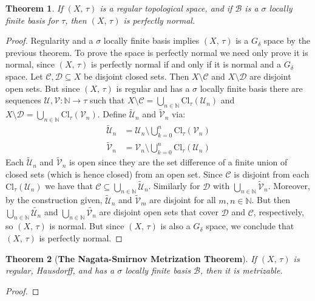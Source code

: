 \documentclass{article}
\theoremstyle{plain}
\newtheorem{theorem}{Theorem}[section]
\theoremstyle{normal}
\begin{document}
        \begin{theorem}
            If $(X,\,\tau)$ is a regular topological space, and if
            $\mathcal{B}$ is a $\sigma$ locally finite basis for $\tau$,
            then $(X,\,\tau)$ is perfectly normal.
        \end{theorem}
        \begin{proof}
            Regularity and a $\sigma$ locally finite basis implies $(X,\,\tau)$
            is a $G_{\delta}$ space by the previous theorem. To prove the space
            is perfectly normal we need only prove it is normal, since
            $(X,\,\tau)$ is perfectly normal if and only if it is normal and a
            $G_{\delta}$ space. Let $\mathcal{C},\mathcal{D}\subseteq{X}$ be
            disjoint closed sets. Then $X\setminus\mathcal{C}$ and
            $X\setminus\mathcal{D}$ are disjoint open sets. But since
            $(X,\,\tau)$ is regular and has a $\sigma$ locally finite basis
            there are sequences
            $\mathcal{U},\mathcal{V}:\mathbb{N}\rightarrow\tau$ such that
            $X\setminus\mathcal{C}=\bigcup_{n\in\mathbb{N}}\textrm{Cl}_{\tau}(\mathcal{U}_{n})$
            and
            $X\setminus\mathcal{D}=\bigcup_{n\in\mathbb{N}}\textrm{Cl}_{\tau}(\mathcal{V}_{n})$.
            Define $\tilde{\mathcal{U}}_{n}$ and
            $\tilde{\mathcal{V}}_{n}$ via:
            \begin{align}
                \tilde{\mathcal{U}}_{n}
                &=\mathcal{U}_{n}\setminus\bigcup_{k=0}^{n}
                    \textrm{Cl}_{\tau}(\mathcal{V}_{n})\\
                \tilde{\mathcal{V}}_{n}
                &=\mathcal{V}_{n}\setminus\bigcup_{k=0}^{n}
                    \textrm{Cl}_{\tau}(\mathcal{U}_{n})
            \end{align}
            Each $\tilde{\mathcal{U}}_{n}$ and $\tilde{\mathcal{V}}_{n}$ is
            open since they are the set difference of a finite union of closed
            sets (which is hence closed) from an open set. Since
            $\mathcal{C}$ is disjoint from each
            $\textrm{Cl}_{\tau}(\mathcal{U}_{n})$ we have that
            $\mathcal{C}\subseteq\bigcup_{n\in\mathbb{N}}\tilde{\mathcal{U}}_{n}$.
            Similarly for $\mathcal{D}$ with
            $\bigcup_{n\in\mathbb{N}}\tilde{\mathcal{V}}_{n}$. Moreover, by the
            construction given, $\tilde{\mathcal{U}}_{n}$ and
            $\tilde{\mathcal{V}}_{m}$ are disjoint for all
            $m,n\in\mathbb{N}$. But then
            $\bigcup_{n\in\mathbb{N}}\tilde{\mathcal{U}_{n}}$ and
            $\bigcup_{n\in\mathbb{N}}\tilde{\mathcal{V}_{n}}$ are disjoint
            open sets that cover $\mathcal{D}$ and $\mathcal{C}$, respectively,
            so $(X,\,\tau)$ is normal. But since $(X,\,\tau)$ is also a
            $G_{\delta}$ space, we conclude that $(X,\,\tau)$ is perfectly
            normal.
        \end{proof}
        \begin{theorem}[\textbf{The Nagata-Smirnov Metrization Theorem}]
            If $(X,\,\tau)$ is regular, Hausdorff, and has a $\sigma$ locally
            finite basis $\mathcal{B}$, then it is metrizable.
        \end{theorem}
        \begin{proof}
            
        \end{proof}
\end{document}

